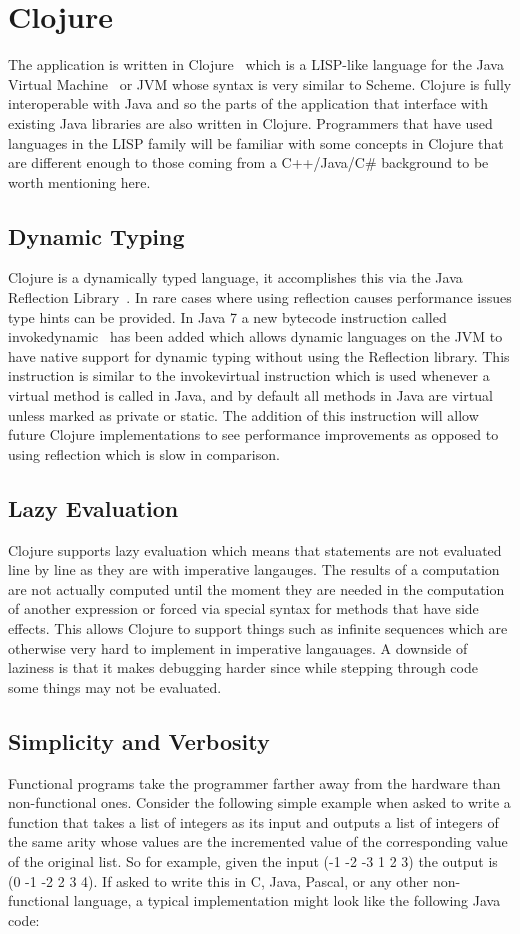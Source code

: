 \chapter[Clojure]{Clojure}
The application is written in Clojure~\cite{clj} which is a LISP-like language for the Java Virtual Machine~\cite{jvm} or JVM whose syntax is very similar to Scheme. Clojure is fully interoperable with Java and so the parts of the application that interface with existing Java libraries are also written in Clojure.
Programmers that have used languages in the LISP family will be familiar with some concepts in Clojure
that are different enough to those coming from a C++/Java/C\# background to be worth mentioning here. 

\section{Dynamic Typing}
Clojure is a dynamically typed language, it accomplishes this via the Java Reflection Library~\cite{reflection}. In rare cases where using reflection causes performance issues type hints can be provided. In Java 7 a new bytecode instruction called invokedynamic~\cite{invokedynamic} has been added which allows dynamic languages on the JVM to have native support for dynamic typing without using the Reflection library. This instruction is similar to the invokevirtual instruction which is used whenever a virtual method is called in Java, and by default all methods in Java are virtual unless marked as private or static. The addition of this instruction will allow future Clojure implementations to see performance improvements as opposed to using reflection which is slow in comparison.  

\section{Lazy Evaluation}
Clojure supports lazy evaluation which means that statements are not evaluated line by line as they are with imperative langauges. The results of a computation are not actually computed until the moment they are needed in the computation of another expression or forced via special syntax for methods that have side effects. This allows Clojure to support things such as infinite sequences which are otherwise very hard to implement in imperative langauages. A downside of laziness is that it makes debugging harder since while stepping through code some things may not be evaluated. 

\section{Simplicity and Verbosity}
Functional programs take the programmer farther away from the hardware than non-functional ones. Consider the following simple example when asked to write a function that takes a list of integers as its input and outputs a list of integers of the same arity whose values are the incremented value of the corresponding value of the original list. So for example, given the input (-1 -2 -3 1 2 3) the output is (0 -1 -2 2 3 4). If asked to write this in C, Java, Pascal, or any other non-functional language, a typical implementation might look like the following Java code: 

